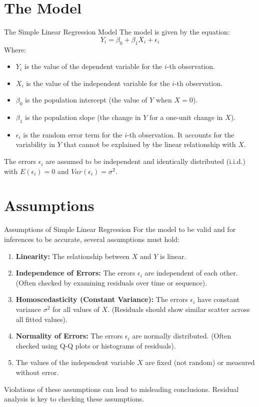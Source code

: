 \documentclass[aspectratio=169]{beamer}
\begin{document}
\section{The Model}
\begin{frame}{The Simple Linear Regression Model}
  The model is given by the equation:
  \begin{equation*}
    Y_i = \beta_0 + \beta_1 X_i + \epsilon_i
  \end{equation*}
  Where:
  \begin{itemize}
    \item $Y_i$ is the value of the dependent variable for the $i$-th observation.
    \item $X_i$ is the value of the independent variable for the $i$-th observation.
    \item $\beta_0$ is the population intercept (the value of $Y$ when $X=0$).
    \item $\beta_1$ is the population slope (the change in $Y$ for a one-unit change in $X$).
    \item $\epsilon_i$ is the random error term for the $i$-th observation. It accounts for the variability in $Y$ that cannot be explained by the linear relationship with $X$.
  \end{itemize}
  The errors $\epsilon_i$ are assumed to be independent and identically distributed (i.i.d.) with $E(\epsilon_i) = 0$ and $Var(\epsilon_i) = \sigma^2$.
\end{frame}

\section{Assumptions}
\begin{frame}{Assumptions of Simple Linear Regression}
  For the model to be valid and for inferences to be accurate, several assumptions must hold:
  \begin{enumerate}
    \item \textbf{Linearity:} The relationship between $X$ and $Y$ is linear.
    \item \textbf{Independence of Errors:} The errors $\epsilon_i$ are independent of each other. (Often checked by examining residuals over time or sequence).
    \item \textbf{Homoscedasticity (Constant Variance):} The errors $\epsilon_i$ have constant variance $\sigma^2$ for all values of $X$. (Residuals should show similar scatter across all fitted values).
    \item \textbf{Normality of Errors:} The errors $\epsilon_i$ are normally distributed. (Often checked using Q-Q plots or histograms of residuals).
    \item The values of the independent variable $X$ are fixed (not random) or measured without error.
  \end{enumerate}
  Violations of these assumptions can lead to misleading conclusions. Residual analysis is key to checking these assumptions.
\end{frame}
\end{document}

